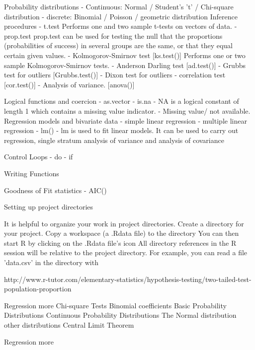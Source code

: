 \documentclass[a4paper,12pt]{article}
\begin{document}
Probability distributions
 - Continuous: Normal / Student's 't' / Chi-square distribution
 - discrete: Binomial / Poisson / geometric distribution
Inference procedures
 - t.test
Performs one and two sample t-tests on vectors of data. 
 - prop.test
	    prop.test can be used for testing the null that the proportions (probabilities of success) in several groups are the same, or that they equal certain given values.
 - Kolmogorov-Smirnov test      [ks.test()]
Performs one or two sample Kolmogorov-Smirnov tests. 
 - Anderson Darling test        [ad.test()]
 - Grubbs test for outliers     [Grubbs.test()]
 - Dixon test for outliers
 - correlation test [cor.test()]
 - Analysis of variance. [anova()]
 

Logical functions and coercion
 - as.vector
 - is.na
 - NA is a logical constant of length 1 which contains a missing value indicator.
 - Missing value/ not available. 
Regression models and bivariate data
 - simple linear regression 
 - multiple linear regression 
 - lm()
 - lm is used to fit linear models. It can be used to carry out regression, single stratum analysis of variance and analysis of covariance 

Control Loops
 - do 
 - if 

Writing Functions

Goodness of Fit statistics
 - AIC()




Setting up project directories

It is helpful to organize your work in project directories.
Create a directory for your project.
Copy a workspace (a .Rdata file) to the directory
You can then start R by clicking on the .Rdata file's icon
All directory references in the R session will be relative to the project directory. For example, you can read a file 'data.csv' in the directory with


 
http://www.r-tutor.com/elementary-statistics/hypothesis-testing/two-tailed-test-population-proportion
 

Regression more
Chi-square Tests
Binomial coefficients
Basic Probability Distributions
Continuous Probability Distributions
The Normal distribution
other distributions
Central Limit Theorem

Regression more
\end{document}
